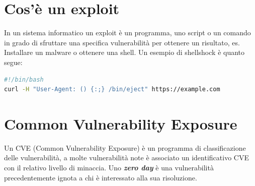 \section{Cos'è un exploit}
In un sistema informatico un exploit è un programma, uno script o un comando in grado di sfruttare una specifica vulnerabilità per ottenere un risultato, es. Installare un malware o ottenere una shell.
Un esempio di shellshock è quanto segue:
\begin{lstlisting}[language=bash,caption={bash version}]
#!/bin/bash
curl -H "User-Agent: () {:;} /bin/eject" https://example.com
\end{lstlisting}

\section{Common Vulnerability Exposure}
Un CVE (Common Vulnerability Exposure) è un programma di classificazione delle vulnerabilità, a molte vulnerabilità note è associato un identificativo CVE con il relativo livello di minaccia.
Uno \textit{\textbf{zero day}} è una vulnerabilità precedentemente ignota a chi è interessato alla sua risoluzione.
